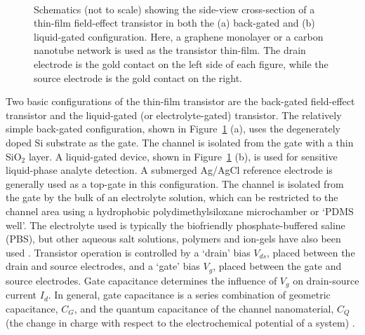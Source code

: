 \documentclass[
  a4paper,
]{scrbook}
\begin{document}
\begin{figure}
\begin{minipage}[t]{0.45\linewidth}
{{}

}

\end{minipage}%
%
\begin{minipage}[t]{0.01\linewidth}

{\centering 

~

}

\end{minipage}%

\caption{\label{fig-gating-schematics}Schematics (not to scale) showing
the side-view cross-section of a thin-film field-effect transistor in
both the (a) back-gated and (b) liquid-gated configuration. Here, a
graphene monolayer or a carbon nanotube network is used as the
transistor thin-film. The drain electrode is the gold contact on the
left side of each figure, while the source electrode is the gold contact
on the right.}

\end{figure}

Two basic configurations of the thin-film transistor are the back-gated
field-effect transistor and the liquid-gated (or electrolyte-gated)
transistor. The relatively simple back-gated configuration, shown in
Figure~\ref{fig-gating-schematics} (a), uses the degenerately doped Si
substrate as the gate. The channel is isolated from the gate with a thin
SiO\(_2\) layer. A liquid-gated device, shown in
Figure~\ref{fig-gating-schematics} (b), is used for sensitive
liquid-phase analyte detection. A submerged Ag/AgCl reference electrode
is generally used as a top-gate in this configuration. The channel is
isolated from the gate by the bulk of an electrolyte solution, which can
be restricted to the channel area using a hydrophobic
polydimethylsiloxane microchamber or `PDMS well'. The electrolyte used
is typically the biofriendly phosphate-buffered saline (PBS), but other
aqueous salt solutions, polymers and ion-gels have also been used
\autocite{Avouris2007,Shkodra2021,Tran2016,Li2023}. Transistor operation
is controlled by a `drain' bias \(V_{ds}\), placed between the drain and
source electrodes, and a `gate' bias \(V_g\), placed between the gate
and source electrodes. Gate capacitance determines the influence of
\(V_g\) on drain-source current \(I_d\). In general, gate capacitance is
a series combination of geometric capacitance, \(C_{G}\), and the
quantum capacitance of the channel nanomaterial, \(C_{Q}\) (the change
in charge with respect to the electrochemical potential of a system)
\autocite{Avouris2007,Cao2009,Heller2009a,Tran2016,Miranda2016,Kireev2017,Li2023}.
\end{document}
